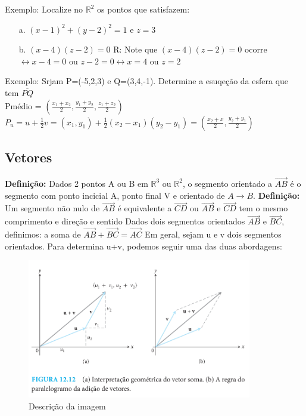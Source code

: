 \date{03.10.2024}

Exemplo: Localize no $\mathbb{R}^2$ os pontos que satisfazem:
\begin{itemize}
    \item[a. ] $(x-1)^2 + (y-2)^2 = 1 $ e $z = 3$
    \item[b. ] $(x-4)(z-2) = 0$ 
        R: Note que $(x-4)(z-2) = 0$ ocorre $\leftrightarrow x -4 = 0$ ou $z-2=0 \leftrightarrow x = 4$ ou $z=2$             
\end{itemize}

Exemplo: Srjam P=(-5,2,3) e Q=(3,4,-1). Determine a esuqeção da esfera que tem $\overline{PQ}$ \\
Pmédio = $\left(\frac{x_1+x_2}{2}, \frac{y_1+y_2}{2}, \frac{z_1+z_2}{2} \right) $
$P_u = u + \frac{1}{2}v = (x_1,y_1)+ \frac{1}{2}(x_2-x_1)(y_2 - y_1) = \left(\frac{x_2+x}{2} , \frac{y_2+y_1}{2} \right)$

\subsection{Vetores}
\textbf{Definição:}
Dados 2 pontos A ou B em $\mathbb{R}^3$ ou $\mathbb{R}^2$, o segmento orientado a $\overrightarrow{AB}$ é o segmento com ponto incicial A, ponto final V e orientado de $A \rightarrow B$.
\textbf{Definição:}
Um segmento não nulo de $\overrightarrow{AB}$ é equivalente a $\overrightarrow{CD}$ ou $\overrightarrow{AB}$ e $\overrightarrow{CD}$ tem o mesmo comprimento e direção e sentido %
Dados dois segmentos orientados $\overrightarrow{AB}$ e $\overrightarrow{BC}$, definimos: a soma de $\overrightarrow{AB} + \overrightarrow{BC} = \overrightarrow{AC}$
Em geral, sejam u e v dois segmentos orientados. Para determina u+v, podemos seguir uma das duas abordagens:
\begin{figure}[!h]
    \centering
    \includegraphics{sources/img/graficosoma.png}
    \caption{Descrição da imagem}
    \label{fig:exemplo}
\end{figure}

